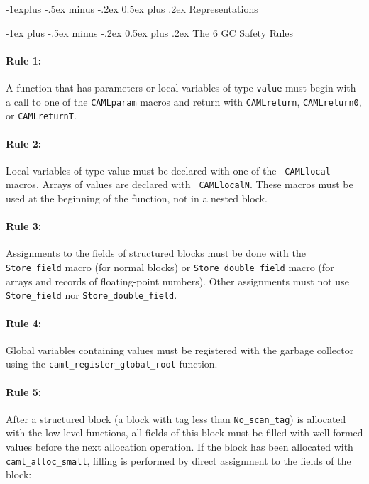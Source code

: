 \documentclass[10pt,landscape]{article}
\makeatletter
\renewcommand{\section}{\@startsection{section}{1}{0mm}%
        {-1ex plus -.5ex minus -.2ex}%
        {0.5ex plus .2ex}%
        {\normalfont\large\bfseries}}
\renewcommand{\subsection}{\@startsection{subsection}{2}{0mm}%
        {-1explus -.5ex minus -.2ex}%
        {0.5ex plus .2ex}%
        {\normalfont\normalsize\bfseries}}
\makeatother
\begin{document}
\begin{multicols}{3}
{}

\subsection{Representations}


\section{The 6 GC Safety Rules}

\paragraph{Rule 1:}
A function that has parameters or local variables of type {\tt value}
must begin with a call to one of the {\tt CAMLparam} macros and return
with {\tt CAMLreturn}, {\tt CAMLreturn0}, or {\tt CAMLreturnT}.

\paragraph{Rule 2:}
 Local variables of type value must be declared with one of the {\tt
   CAMLlocal} macros. Arrays of values are declared with {\tt
   CAMLlocalN}. These macros must be used at the beginning of the
 function, not in a nested block.

\paragraph{Rule 3:}
Assignments to the fields of structured blocks must be done with the
\verb!Store_field! macro (for normal blocks) or
\verb!Store_double_field! macro (for arrays and records of
floating-point numbers). Other assignments must not use
\verb!Store_field!  nor \verb!Store_double_field!.

\paragraph{Rule 4:}
Global variables containing values must be registered with the garbage
collector using the \verb!caml_register_global_root! function.

\paragraph{Rule 5:}
 After a structured block (a block with tag less than
 \verb!No_scan_tag!) is allocated with the low-level functions, all
 fields of this block must be filled with well-formed values before
 the next allocation operation. If the block has been allocated with
 \verb!caml_alloc_small!, filling is performed by direct assignment to
 the fields of the block:


\end{multicols}
\end{document}
